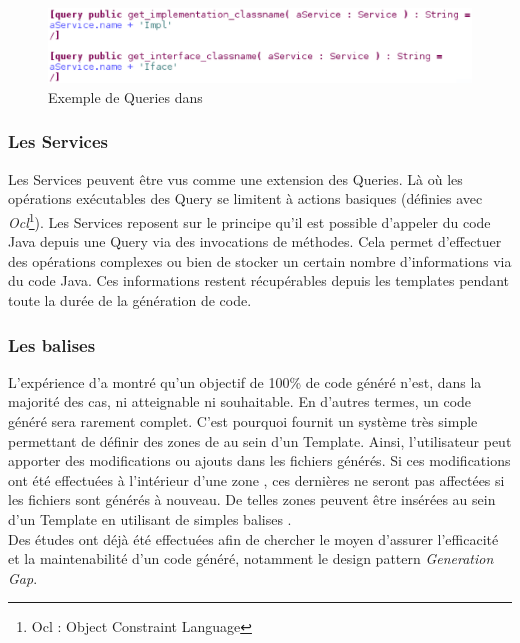 \begin{figure}[htb]
  \centering
  \includegraphics[scale=0.6]{img/screen_query.eps}
  \caption{Exemple de Queries dans \kwacceleo{}}
  \label{fig:acc_module}
\end{figure}

\subsubsection{Les Services}

Les Services peuvent être vus comme une extension des Queries. Là où les opérations exécutables des Query se limitent à actions basiques (définies avec \textit{Ocl}\footnote{Ocl : Object Constraint Language}). Les Services reposent sur le principe qu'il est possible d'appeler du code Java depuis une Query via des invocations de méthodes. Cela permet d'effectuer des opérations complexes ou bien de stocker un certain nombre d'informations via du code Java. Ces informations restent récupérables depuis les templates pendant toute la durée de la génération de code.

\subsubsection{Les balises }

L'expérience d'\kwobeo a montré qu'un objectif de 100\% de code généré n'est, dans la majorité des cas, ni atteignable ni souhaitable.
En d'autres termes, un code généré sera rarement complet. C'est pourquoi \kwacceleo fournit un système très simple permettant de définir des zones de  au sein d'un Template. Ainsi, l'utilisateur peut apporter des modifications ou ajouts dans les fichiers générés. Si ces modifications ont été effectuées à l'intérieur d'une zone , ces dernières ne seront pas affectées si les fichiers sont générés à nouveau.
De telles zones peuvent être insérées au sein d'un Template en utilisant de simples balises \guim{\textit{\textbf{[protected]}}}.
\\
Des études ont déjà été effectuées afin de chercher le moyen d'assurer l'efficacité et la maintenabilité d'un code généré, notamment le design pattern \textit{Generation Gap}\cite{gen_gap}.

